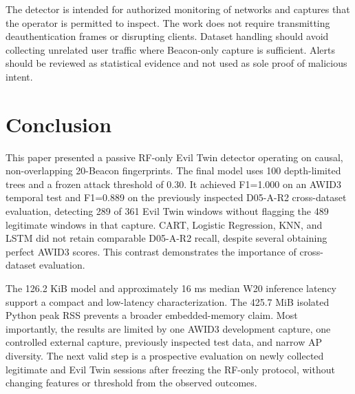 \documentclass[conference]{IEEEtran}
\begin{document}
The detector is intended for authorized monitoring of networks and captures that the operator is permitted to inspect. The work does not require transmitting deauthentication frames or disrupting clients. Dataset handling should avoid collecting unrelated user traffic where Beacon-only capture is sufficient. Alerts should be reviewed as statistical evidence and not used as sole proof of malicious intent.

\section{Conclusion}

This paper presented a passive RF-only Evil Twin detector operating on causal, non-overlapping 20-Beacon fingerprints. The final model uses 100 depth-limited trees and a frozen attack threshold of 0.30. It achieved F1=1.000 on an AWID3 temporal test and F1=0.889 on the previously inspected D05-A-R2 cross-dataset evaluation, detecting 289 of 361 Evil Twin windows without flagging the 489 legitimate windows in that capture. CART, Logistic Regression, KNN, and LSTM did not retain comparable D05-A-R2 recall, despite several obtaining perfect AWID3 scores. This contrast demonstrates the importance of cross-dataset evaluation.

The 126.2 KiB model and approximately 16 ms median W20 inference latency support a compact and low-latency characterization. The 425.7 MiB isolated Python peak RSS prevents a broader embedded-memory claim. Most importantly, the results are limited by one AWID3 development capture, one controlled external capture, previously inspected test data, and narrow AP diversity. The next valid step is a prospective evaluation on newly collected legitimate and Evil Twin sessions after freezing the RF-only protocol, without changing features or threshold from the observed outcomes.
\end{document}
